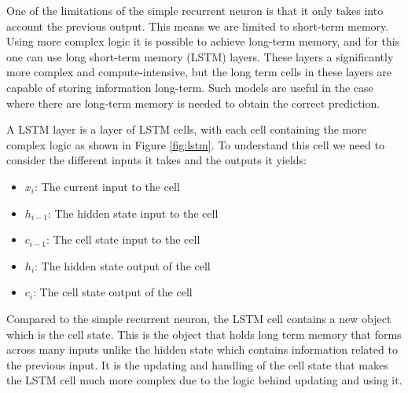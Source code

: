 \documentclass[12pt,a4paper]{article} %
\numberwithin{equation}{section}
\begin{document}
		One of the limitations of the simple recurrent neuron is that it only takes into account the previous output. This means we are limited to short-term memory. Using more complex logic it is possible to achieve long-term memory, and for this one can use long short-term memory (LSTM) layers. These layers a significantly more complex and compute-intensive, but the long term cells in these layers are capable of storing information long-term. Such models are useful in the case where there are long-term memory is needed to obtain the correct prediction.
		
		A LSTM layer is a layer of LSTM cells, with each cell containing the more complex logic as shown in Figure \ref{fig:lstm}. To understand this cell we need to consider the different inputs it takes and the outputs it yields:
		\begin{itemize}
			\item $x_i$: The current input to the cell
			\item $h_{i-1}$: The hidden state input to the cell
			\item $c_{i-1}$: The cell state input to the cell
			\item $h_{i}$: The hidden state output of the cell
			\item $c_{i}$: The cell state output of the cell
		\end{itemize}
		Compared to the simple recurrent neuron, the LSTM cell contains a new object which is the cell state. This is the object that holds long term memory that forms across many inputs unlike the hidden state which contains information related to the previous input. It is the updating and handling of the cell state that makes the LSTM cell much more complex due to the logic behind updating and using it.
		
\end{document}
